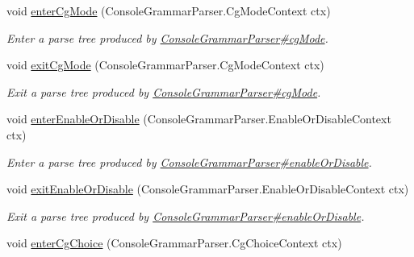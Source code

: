 \begin{DoxyCompactItemize}
void \hyperlink{interfacegov_1_1nasa_1_1jpf_1_1inspector_1_1client_1_1parser_1_1_console_grammar_listener_a185f52ffc3171ab8e01ee2a0012e5bf7}{enter\+Cg\+Mode} (Console\+Grammar\+Parser.\+Cg\+Mode\+Context ctx)
\begin{DoxyCompactList}\small\item\em Enter a parse tree produced by \hyperlink{classgov_1_1nasa_1_1jpf_1_1inspector_1_1client_1_1parser_1_1_console_grammar_parser_af43a448b70b2817dcedfc1f3d360cd42}{Console\+Grammar\+Parser\#cg\+Mode}. \end{DoxyCompactList}\item 
void \hyperlink{interfacegov_1_1nasa_1_1jpf_1_1inspector_1_1client_1_1parser_1_1_console_grammar_listener_a16fe8a6a287f9b4d40ae33d1bf0dff3c}{exit\+Cg\+Mode} (Console\+Grammar\+Parser.\+Cg\+Mode\+Context ctx)
\begin{DoxyCompactList}\small\item\em Exit a parse tree produced by \hyperlink{classgov_1_1nasa_1_1jpf_1_1inspector_1_1client_1_1parser_1_1_console_grammar_parser_af43a448b70b2817dcedfc1f3d360cd42}{Console\+Grammar\+Parser\#cg\+Mode}. \end{DoxyCompactList}\item 
void \hyperlink{interfacegov_1_1nasa_1_1jpf_1_1inspector_1_1client_1_1parser_1_1_console_grammar_listener_a8ab1ec8f746961f2acf40deaecec946c}{enter\+Enable\+Or\+Disable} (Console\+Grammar\+Parser.\+Enable\+Or\+Disable\+Context ctx)
\begin{DoxyCompactList}\small\item\em Enter a parse tree produced by \hyperlink{classgov_1_1nasa_1_1jpf_1_1inspector_1_1client_1_1parser_1_1_console_grammar_parser_aa5fa0739c6c5c8346b0476e6f75df5e4}{Console\+Grammar\+Parser\#enable\+Or\+Disable}. \end{DoxyCompactList}\item 
void \hyperlink{interfacegov_1_1nasa_1_1jpf_1_1inspector_1_1client_1_1parser_1_1_console_grammar_listener_a595a1a272c691d6b85cb9ca4e205a99e}{exit\+Enable\+Or\+Disable} (Console\+Grammar\+Parser.\+Enable\+Or\+Disable\+Context ctx)
\begin{DoxyCompactList}\small\item\em Exit a parse tree produced by \hyperlink{classgov_1_1nasa_1_1jpf_1_1inspector_1_1client_1_1parser_1_1_console_grammar_parser_aa5fa0739c6c5c8346b0476e6f75df5e4}{Console\+Grammar\+Parser\#enable\+Or\+Disable}. \end{DoxyCompactList}\item 
void \hyperlink{interfacegov_1_1nasa_1_1jpf_1_1inspector_1_1client_1_1parser_1_1_console_grammar_listener_a82aa9048b879283ddb342a317a2120a5}{enter\+Cg\+Choice} (Console\+Grammar\+Parser.\+Cg\+Choice\+Context ctx)

\end{DoxyCompactItemize}
